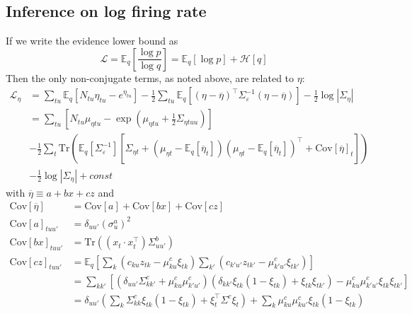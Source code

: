 \documentclass[11pt]{article}
\begin{document}
\subsection{Inference on log firing rate}
If we write the evidence lower bound as
\begin{equation}
    \mathcal{L} = \mathbb{E}_q \left[ \frac{\log p}{\log q}\right] =
    \mathbb{E}_q[\log p] + \mathcal{H}[q]
\end{equation}
Then the only non-conjugate terms, as noted above, are related to $\eta$:
\begin{align}
    \mathcal{L}_\eta &=
    \sum_{tu} \mathbb{E}_q[N_{tu} \eta_{tu} - e^{\eta_{tu}}]
    - \frac{1}{2} \sum_{tu} \mathbb{E}_q \left[
    (\eta - \overline{\eta})^\top \Sigma_\varepsilon^{-1}(\eta - \overline{\eta}) \right]
    - \frac{1}{2} \log |\Sigma_\eta| \\
    &= \sum_{tu} \left[ N_{tu} \mu_{\eta tu} -
    \exp\left(\mu_{\eta tu} + \frac{1}{2} \Sigma_{\eta tuu} \right)\right] \\
    &- \frac{1}{2} \sum_{t} \mathrm{Tr}\left(
    \mathbb{E}_q[\Sigma_\varepsilon^{-1}]
    \left[ \Sigma_{\eta t} + (\mu_{\eta t} - \mathbb{E}_q[\overline{\eta}_{t}])
    (\mu_{\eta t} - \mathbb{E}_q[\overline{\eta}_{t}])^\top
    + \mathrm{Cov}[\overline{\eta}]_{t}\right] \right) \\
    &- \frac{1}{2} \log |\Sigma_\eta| + const
\end{align}
with $\overline{\eta} \equiv a + bx + cz$ and
\begin{align}
    \mathrm{Cov}[\overline{\eta}] &= \mathrm{Cov}[a] + \mathrm{Cov}[bx] + \mathrm{Cov}[cz] \\
    \mathrm{Cov}[a]_{tuu'} &= \delta_{uu'}(\sigma^a_u)^2 \\
    \mathrm{Cov}[bx]_{tuu'} &= \mathrm{Tr}\left((x_t\cdot x_t^\top) \Sigma^b_{uu'}\right) \\
    \mathrm{Cov}[cz]_{tuu'} &= \mathbb{E}_q\left[\sum_{k}\left( c_{ku} z_{tk} - \mu^c_{ku}\xi_{tk} \right)\sum_{k'}\left( c_{k'u'} z_{tk'} - \mu^c_{k'u'}\xi_{tk'} \right)\right] \\
    &= \sum_{kk'}\left[\left(\delta_{uu'}\Sigma^c_{kk'} + \mu^c_{ku} \mu^c_{k'u'} \right)\left(\delta_{kk'}\xi_{tk}(1 - \xi_{tk}) + \xi_{tk}\xi_{tk'}\right) - \mu^c_{ku}\mu^c_{k'u'}\xi_{tk}\xi_{tk'} \right] \\
    &= \delta_{uu'}\left(\sum_k \Sigma^c_{kk} \xi_{tk} (1 - \xi_{tk}) + \xi_t^\top \Sigma^c \xi_t\right) + \sum_k \mu^c_{ku}\mu^c_{ku'}\xi_{tk}(1 - \xi_{tk})\\
\end{align}
\end{document}
